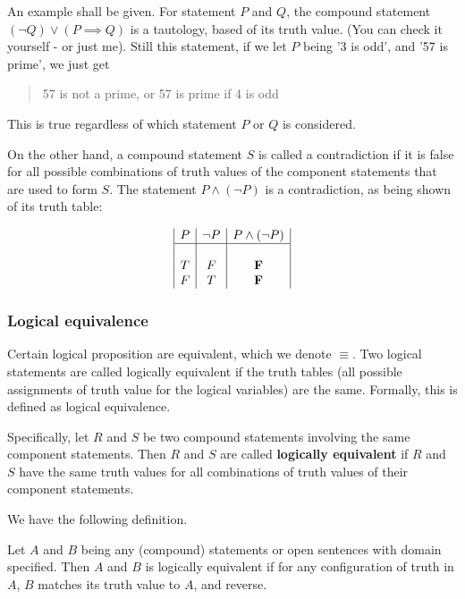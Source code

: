 An example shall be given. For statement $P$ and $Q$, the compound statement $(\lnot Q) \lor (P \implies Q)$ is a tautology, based of its truth value. (You can check it yourself - or just me). Still this statement, if we let $P$ being '3 is odd', and '57 is prime', we just get
\begin{quote}
    57 is not a prime, or 57 is prime if 4 is odd
\end{quote}
This is true regardless of which statement $P$ or $Q$ is considered. 

On the other hand, a compound statement $S$ is called a  contradiction if it is false for all possible combinations of truth values of the component statements that are used to form $S$. The statement $P \land (\lnot P)$ is a contradiction, as being shown of its truth table:

\begin{equation*}
    \begin{array}{|c|c|c|}
        P  & \lnot P & P \land (\lnot P) \\
        \hline & & \\
        T & F & \mathbf{F} \\
        F & T & \mathbf{F}
    \end{array}
\end{equation*}

\subsubsection{Logical equivalence}

Certain logical proposition are equivalent, which we denote $\equiv$. Two logical statements are called logically equivalent if the truth tables (all possible assignments of truth value for the logical variables) are the same. Formally, this is defined as  logical equivalence.

Specifically, let $R$ and $S$ be two compound statements involving the same component statements. Then $R$ and $S$ are called \textbf{logically equivalent} if $R$ and $S$ have the same truth values for all combinations of truth values of their component statements.

We have the following definition. 

\begin{definition}
    Let $A$ and $B$ being any (compound) statements or open sentences with domain specified. Then $A$ and $B$ is logically equivalent if for any configuration of truth in $A$, $B$ matches its truth value to $A$, and reverse. 
\end{definition}

